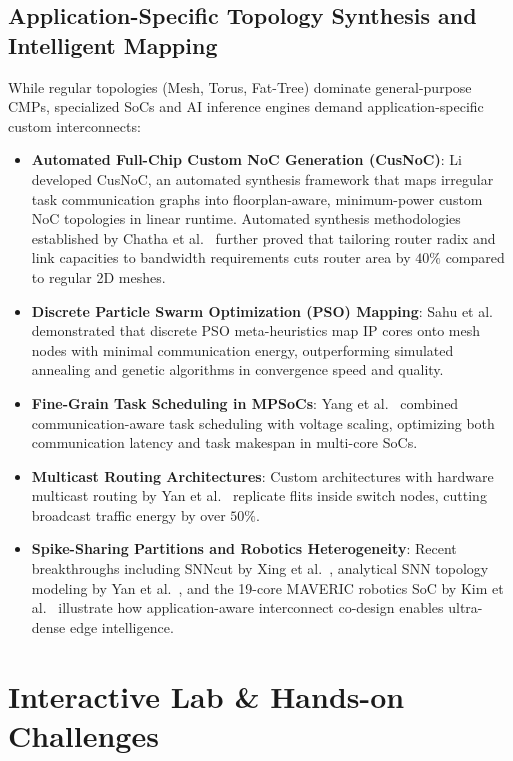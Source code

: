 \subsection{Application-Specific Topology Synthesis and Intelligent Mapping}
\label{sec:ch4_synthesis_mapping}
While regular topologies (Mesh, Torus, Fat-Tree) dominate general-purpose CMPs, specialized SoCs and AI inference engines demand application-specific custom interconnects:
\begin{itemize}
    \item \textbf{Automated Full-Chip Custom NoC Generation (CusNoC)}: Li~\cite{Li2013CusNoC} developed CusNoC, an automated synthesis framework that maps irregular task communication graphs into floorplan-aware, minimum-power custom NoC topologies in linear runtime. Automated synthesis methodologies established by Chatha et al.~\cite{Chatha2008} further proved that tailoring router radix and link capacities to bandwidth requirements cuts router area by $40\%$ compared to regular 2D meshes.
    \item \textbf{Discrete Particle Swarm Optimization (PSO) Mapping}: Sahu et al.~\cite{Sahu2014} demonstrated that discrete PSO meta-heuristics map IP cores onto mesh nodes with minimal communication energy, outperforming simulated annealing and genetic algorithms in convergence speed and quality.
    \item \textbf{Fine-Grain Task Scheduling in MPSoCs}: Yang et al.~\cite{Yang2016} combined communication-aware task scheduling with voltage scaling, optimizing both communication latency and task makespan in multi-core SoCs.
    \item \textbf{Multicast Routing Architectures}: Custom architectures with hardware multicast routing by Yan et al.~\cite{Yan2009Multicast} replicate flits inside switch nodes, cutting broadcast traffic energy by over $50\%$.
    \item \textbf{Spike-Sharing Partitions and Robotics Heterogeneity}: Recent breakthroughs including SNNcut by Xing et al.~\cite{Xing2026SNNcut}, analytical SNN topology modeling by Yan et al.~\cite{Yan2026SNN}, and the 19-core MAVERIC robotics SoC by Kim et al.~\cite{Kim2026Mav} illustrate how application-aware interconnect co-design enables ultra-dense edge intelligence.
\end{itemize}

\section{Interactive Lab \& Hands-on Challenges}
\label{sec:ch4_interactive}

